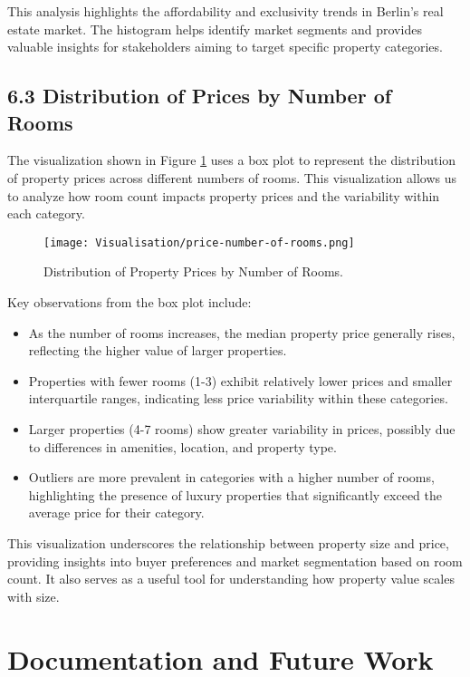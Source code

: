 \documentclass[twocolumn]{article}
\begin{document}
This analysis highlights the affordability and exclusivity trends in Berlin's real estate market. The histogram helps identify market segments and provides valuable insights for stakeholders aiming to target specific property categories.
\subsection*{6.3 Distribution of Prices by Number of Rooms}
The visualization shown in Figure \ref{fig:price_by_rooms} uses a box plot to represent the distribution of property prices across different numbers of rooms. This visualization allows us to analyze how room count impacts property prices and the variability within each category.

\begin{figure}[H]
    \centering
    \texttt{[image: Visualisation/price-number-of-rooms.png]} 
    \caption{Distribution of Property Prices by Number of Rooms.}
    \label{fig:price_by_rooms}
\end{figure}

Key observations from the box plot include:
\begin{itemize}
    \item As the number of rooms increases, the median property price generally rises, reflecting the higher value of larger properties.
    \item Properties with fewer rooms (1-3) exhibit relatively lower prices and smaller interquartile ranges, indicating less price variability within these categories.
    \item Larger properties (4-7 rooms) show greater variability in prices, possibly due to differences in amenities, location, and property type.
    \item Outliers are more prevalent in categories with a higher number of rooms, highlighting the presence of luxury properties that significantly exceed the average price for their category.
\end{itemize}

This visualization underscores the relationship between property size and price, providing insights into buyer preferences and market segmentation based on room count. It also serves as a useful tool for understanding how property value scales with size.


\section{Documentation and Future Work}



\end{document}
